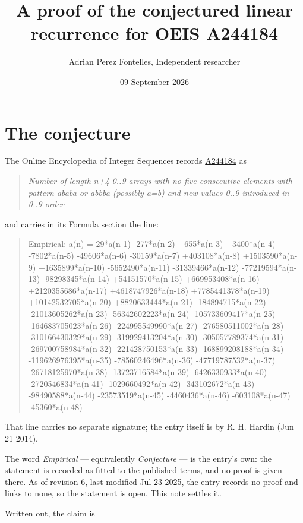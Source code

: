 \documentclass[11pt]{article}
\title{A proof of the conjectured linear recurrence for OEIS A244184}
\author{Adrian Perez Fontelles, Independent researcher}
\date{09 September 2026}
\theoremstyle{definition}
\begin{document}
\maketitle
\section{The conjecture}

The Online Encyclopedia of Integer Sequences records \href{https://oeis.org/A244184}{A244184} as

\begin{quote}\itshape Number of length n+4 0..9 arrays with no five consecutive elements with pattern ababa or abbba (possibly a=b) and new values 0..9 introduced in 0..9 order\end{quote}

and carries in its Formula section the line:

\begin{quote}\ttfamily Empirical: a(n) = 29*a(n-1) -277*a(n-2) +655*a(n-3) +3400*a(n-4) -7802*a(n-5) -49606*a(n-6) -30159*a(n-7) +403108*a(n-8) +1503590*a(n-9) +1635899*a(n-10) -5652490*a(n-11) -31339466*a(n-12) -77219594*a(n-13) -98298345*a(n-14) +54151570*a(n-15) +669953408*a(n-16) +2120355686*a(n-17) +4618747926*a(n-18) +7785441378*a(n-19) +10142532705*a(n-20) +8820633444*a(n-21) -184894715*a(n-22) -21013605262*a(n-23) -56342602223*a(n-24) -105733609417*a(n-25) -164683705023*a(n-26) -224995549990*a(n-27) -276580511002*a(n-28) -310166430329*a(n-29) -319929413204*a(n-30) -305057789374*a(n-31) -269700758984*a(n-32) -221428750153*a(n-33) -168899208188*a(n-34) -119626976395*a(n-35) -78560246496*a(n-36) -47719787532*a(n-37) -26718125970*a(n-38) -13723716584*a(n-39) -6426330933*a(n-40) -2720546834*a(n-41) -1029660492*a(n-42) -343102672*a(n-43) -98490588*a(n-44) -23573519*a(n-45) -4460436*a(n-46) -603108*a(n-47) -45360*a(n-48)\end{quote}

That line carries no separate signature; the entry itself is by R. H. Hardin (Jun 21 2014).

The word {\itshape Empirical} --- equivalently {\itshape Conjecture} --- is the entry's own: the statement is recorded as fitted to the published terms, and no proof is given there. As of revision 6, last modified Jul 23 2025, the entry records no proof and links to none, so the statement is open. This note settles it.

Written out, the claim is
\end{document}
